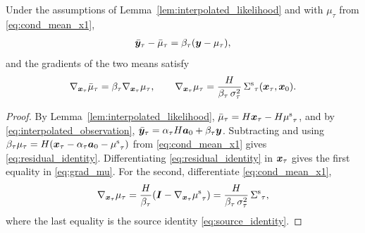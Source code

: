 \begin{lemma}\label{lem:residual_identity}
Under the assumptions of Lemma~\ref{lem:interpolated_likelihood} and with $\mu_\tau$ from \eqref{eq:cond_mean_x1},
\begin{align}\label{eq:residual_identity}
    \bar{\boldsymbol{y}}_\tau - \bar{\mu}_\tau = \beta_\tau (\boldsymbol{y} - \mu_\tau),
\end{align}
and the gradients of the two means satisfy
\begin{align}\label{eq:grad_mu}
    \nabla_{\boldsymbol{x}_\tau} \bar{\mu}_\tau = \beta_\tau \nabla_{\boldsymbol{x}_\tau} \mu_\tau,
    \qquad
    \nabla_{\boldsymbol{x}_\tau} \mu_\tau
    = \frac{H}{\beta_\tau\,\sigma_\tau^2}\,{\Sigma^{\mathrm{s}}}_\tau(\boldsymbol{x}_\tau, \boldsymbol{x}_0).
\end{align}
\end{lemma}
\begin{proof}
By Lemma~\ref{lem:interpolated_likelihood}, $\bar{\mu}_\tau = H \boldsymbol{x}_\tau - H {\mu^{\mathrm{s}}}_\tau$, and by \eqref{eq:interpolated_observation}, $\bar{\boldsymbol{y}}_\tau = \alpha_\tau H \bm a_0 + \beta_\tau \boldsymbol{y}$. Subtracting and using $\beta_\tau\mu_\tau = H(\boldsymbol{x}_\tau-\alpha_\tau\bm a_0-{\mu^{\mathrm{s}}}_\tau)$ from \eqref{eq:cond_mean_x1} gives \eqref{eq:residual_identity}. Differentiating \eqref{eq:residual_identity} in $\boldsymbol{x}_\tau$ gives the first equality in \eqref{eq:grad_mu}. For the second, differentiate \eqref{eq:cond_mean_x1},
\begin{align}
    \nabla_{\boldsymbol{x}_\tau} \mu_\tau
    = \frac{H}{\beta_\tau}\!\left(\bm{I} - \nabla_{\boldsymbol{x}_\tau}{\mu^{\mathrm{s}}}_\tau\right)
    = \frac{H}{\beta_\tau\,\sigma_\tau^2}\,{\Sigma^{\mathrm{s}}}_\tau,
\end{align}
where the last equality is the source identity \eqref{eq:source_identity}.
\end{proof}

